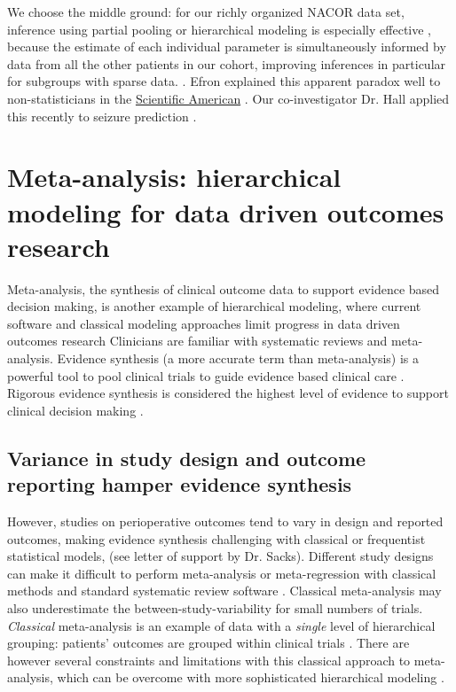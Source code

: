 \documentclass[11pt,notitlepage]{article}
\begin{document}
We choose the middle ground: for our richly organized NACOR data set, inference using partial pooling or hierarchical modeling is especially effective , because the estimate of each individual parameter is simultaneously informed by data from all the other patients in our cohort, improving inferences in particular for subgroups with sparse data. \cite{Gelman2009}. Efron explained this apparent paradox well to non-statisticians in the \href{http://www.nature.com/scientificamerican/journal/v236/n5/pdf/scientificamerican0577-119.pdf}{Scientific American} \cite{Stein_paradox_Scientific_American}. Our co-investigator Dr. Hall applied this recently to seizure prediction \cite{Hall2009a}. 

\section*{Meta-analysis: hierarchical modeling for data driven outcomes research}
Meta-analysis, the synthesis of clinical outcome data to support evidence based decision making, is another example of hierarchical modeling, where current software and classical modeling approaches limit progress in data driven outcomes research \cite{Andreae2015} Clinicians are familiar with systematic reviews and meta-analysis\cite{Sackett1996}. Evidence synthesis (a more accurate term than meta-analysis) is a powerful tool to pool clinical trials to guide evidence based clinical care \cite{Ashby2000}. Rigorous evidence synthesis is considered the highest level of evidence to support clinical decision making \cite{Cook1997}. 

\subsection*{Variance in study design and outcome reporting hamper evidence synthesis}
However, studies on perioperative outcomes tend to vary in design and reported outcomes\cite{Andreae2013}, making evidence synthesis challenging with classical or frequentist statistical models\cite{Spiegelhalter_11134920}, (see letter of support by Dr. Sacks). Different study designs can make it difficult to perform meta-analysis or meta-regression with classical methods and standard systematic review software \cite{Deeks2011chapter}. Classical meta-analysis may also underestimate the between-study-variability for small numbers of trials\cite{Song2012,Cornell2014,Andreae2015}. \textit{Classical} meta-analysis is an example of data with a \textit{single} level of hierarchical grouping: patients' outcomes are grouped within clinical trials \cite{egger2008systematic}. There are however several constraints and limitations with this classical approach to meta-analysis, which can be overcome with more sophisticated hierarchical modeling  \cite{Andreae2015,Thompson2002,Abroug2011}. 
\end{document}
